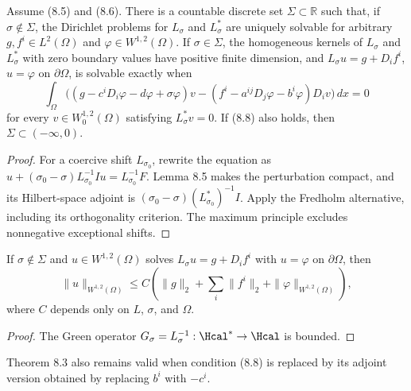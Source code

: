 \begin{theorem}
\label{gt-thm-8-6-fredholm-alternative}
Assume (8.5) and (8.6). There is a countable discrete set
$\Sigma\subset\mathbb R$ such that, if $\sigma\notin\Sigma$, the Dirichlet
problems for $L_\sigma$ and $L_\sigma^*$ are uniquely solvable for arbitrary
$g,f^i\in L^2(\Omega)$ and $\varphi\in W^{1,2}(\Omega)$. If
$\sigma\in\Sigma$, the homogeneous kernels of $L_\sigma$ and $L_\sigma^*$
with zero boundary values have positive finite dimension, and
$L_\sigma u=g+D_if^i$, $u=\varphi$ on $\partial\Omega$, is solvable exactly when
\begin{equation}
\int_\Omega\bigl((g-c^iD_i\varphi-d\varphi+\sigma\varphi)v
 -(f^i-a^{ij}D_j\varphi-b^i\varphi)D_iv\bigr)\,dx=0
\tag{8.15}
\end{equation}
for every $v\in W_0^{1,2}(\Omega)$ satisfying $L_\sigma^*v=0$. If (8.8)
also holds, then $\Sigma\subset(-\infty,0)$.
\end{theorem}
\begin{proof}
\sketch For a coercive shift $L_{\sigma_0}$, rewrite the equation as
$u+(\sigma_0-\sigma)L_{\sigma_0}^{-1}Iu=L_{\sigma_0}^{-1}F$. Lemma 8.5
makes the perturbation compact, and its Hilbert-space adjoint is
$(\sigma_0-\sigma)(L_{\sigma_0}^*)^{-1}I$. Apply the Fredholm alternative,
including its orthogonality criterion. The maximum principle excludes
nonnegative exceptional shifts.
\end{proof}

\begin{corollary}
\label{gt-cor-8-7-resolvent-estimate}
If $\sigma\notin\Sigma$ and $u\in W^{1,2}(\Omega)$ solves
$L_\sigma u=g+D_if^i$ with $u=\varphi$ on $\partial\Omega$, then
\begin{equation}
\|u\|_{W^{1,2}(\Omega)}
\leq C\left(\|g\|_2+\sum_i\|f^i\|_2
+\|\varphi\|_{W^{1,2}(\Omega)}\right),
\tag{8.16}
\end{equation}
where $C$ depends only on $L$, $\sigma$, and $\Omega$.
\end{corollary}
\begin{proof}
\sketch The Green operator $G_\sigma=L_\sigma^{-1}:\Hcal^*\to\Hcal$ is bounded.
\end{proof}

\begin{remark}
\label{gt-rem-8-adjoint-sign-solvability}
Theorem 8.3 also remains valid when condition (8.8) is replaced by its adjoint
version obtained by replacing $b^i$ with $-c^i$.
\end{remark}

